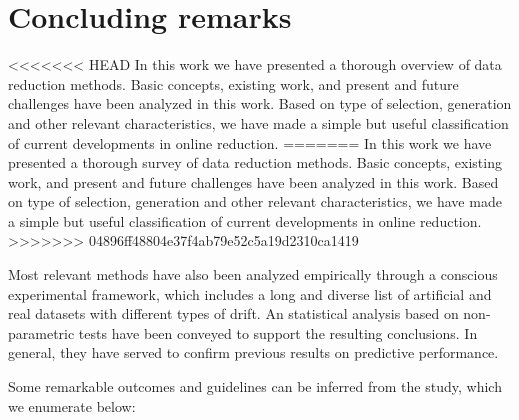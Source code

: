 \documentclass[preprint,12pt]{elsarticle}
\begin{document}
\section{Concluding remarks}
\label{sec:conclusions}

<<<<<<< HEAD
In this work we have presented a thorough overview of data reduction methods. Basic concepts, existing work, and present and future challenges have been analyzed in this work. Based on type of selection, generation and other relevant characteristics, we have made a simple but useful classification of current developments in online reduction. 
=======
In this work we have presented a thorough survey of data reduction methods. Basic concepts, existing work, and present and future challenges have been analyzed in this work. Based on type of selection, generation and other relevant characteristics, we have made a simple but useful classification of current developments in online reduction. 
>>>>>>> 04896ff48804e37f4ab79e52c5a19d2310ca1419

Most relevant methods have also been analyzed empirically through a conscious experimental framework, which includes a long and diverse list of artificial and real datasets with different types of drift. An statistical analysis based on non-parametric tests have been conveyed to support the resulting conclusions. In general, they have served to confirm previous results on predictive performance. 

Some remarkable outcomes and guidelines can be inferred from the study, which we enumerate below:
\end{document}
